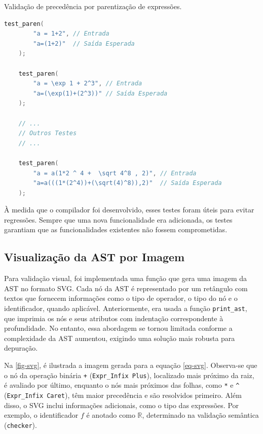 \begin{codigo}[H]
    \caption{\small Validação de precedência por parentização de expressões.}
        \label{cod-test-paren}
  \begin{lstlisting}[language = C]
    test_paren(
        "a = 1+2", // Entrada
        "a=(1+2)"  // Saída Esperada
    );

    test_paren(
        "a = \exp 1 + 2^3", // Entrada
        "a=(\exp(1)+(2^3))" // Saída Esperada
    );

    // ...
    // Outros Testes
    // ...

    test_paren(
        "a = a(1*2 ^ 4 +  \sqrt 4^8 , 2)", // Entrada
        "a=a(((1*(2^4))+(\sqrt(4)^8)),2)"  // Saída Esperada
    );
  \end{lstlisting}
\end{codigo}

À medida que o compilador foi desenvolvido, esses testes foram úteis para evitar regressões. Sempre que uma nova funcionalidade era adicionada, os testes garantiam que as funcionalidades existentes não fossem comprometidas.




\subsection{Visualização da AST por Imagem} \label{subsection-svg}

Para validação visual, foi implementada uma função que gera uma imagem da AST no formato SVG. Cada nó da AST é representado por um retângulo com textos que fornecem informações como o tipo de operador, o tipo do nó e o identificador, quando aplicável. Anteriormente, era usada a função \texttt{print\_ast}, que imprimia os nós e seus atributos com indentação correspondente à profundidade. No entanto, essa abordagem se tornou limitada conforme a complexidade da AST aumentou, exigindo uma solução mais robusta para depuração.

Na \autoref{fig-svg}, é ilustrada a imagem gerada para a equação \autoref{eq-svg}. Observa-se que o nó da operação binária \texttt{+} (\verb"Expr_Infix Plus"), localizado mais próximo da raiz, é avaliado por último, enquanto o nós mais próximos das folhas, como \texttt{*} e \texttt{\^} (\verb"Expr_Infix Caret"), têm maior precedência e são resolvidos primeiro. Além disso, o SVG inclui informações adicionais, como o tipo das expressões. Por exemplo, o identificador \( f \) é anotado como \( \mathbb{R} \), determinado na validação semântica (\texttt{checker}).

